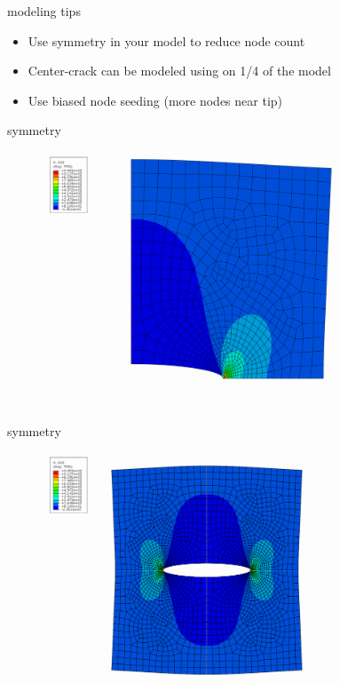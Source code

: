 \documentclass[10pt]{beamer}
\begin{document}
	\begin{frame}{modeling tips}
		\begin{itemize}[<+->]
			\item Use symmetry in your model to reduce node count
			\item Center-crack can be modeled using on 1/4 of the model
			\item Use biased node seeding (more nodes near tip)
		\end{itemize}
	\end{frame}
	
	\begin{frame}{symmetry}
		\begin{figure}
			\centering
			\includegraphics[width=0.7\linewidth]{../Figures/singularity_quarter}
			\caption{}
			\label{fig:singularity_quarter}
		\end{figure}
	\end{frame}
	
	\begin{frame}{symmetry}
		\begin{figure}
		\centering
		\includegraphics[width=0.7\linewidth]{../Figures/singularity_mirrored}
		\caption{}
		\label{fig:singularity_mirrored}
		\end{figure}
	\end{frame}
	
\end{document}
